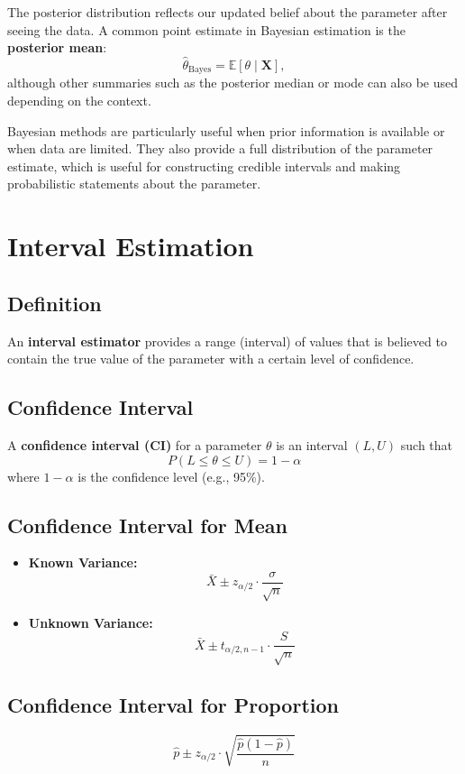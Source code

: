 \documentclass[twoside]{book}
\begin{document}
The posterior distribution reflects our updated belief about the parameter after seeing the data. A common point estimate in Bayesian estimation is the \textbf{posterior mean}:
\[
\hat{\theta}_{\text{Bayes}} = \mathbb{E}[\theta \mid \mathbf{X}],
\]
although other summaries such as the posterior median or mode can also be used depending on the context.

Bayesian methods are particularly useful when prior information is available or when data are limited. They also provide a full distribution of the parameter estimate, which is useful for constructing credible intervals and making probabilistic statements about the parameter.



\section{Interval Estimation}
\subsection{Definition}
An \textbf{interval estimator} provides a range (interval) of values that is believed to contain the true value of the parameter with a certain level of confidence.

\subsection{Confidence Interval}
A \textbf{confidence interval (CI)} for a parameter \( \theta \) is an interval \( (L, U) \) such that
\[
P(L \leq \theta \leq U) = 1 - \alpha
\]
where \( 1 - \alpha \) is the confidence level (e.g., 95\%).

\subsection{Confidence Interval for Mean}
\begin{itemize}
    \item \textbf{Known Variance:}
    \[
    \bar{X} \pm z_{\alpha/2} \cdot \frac{\sigma}{\sqrt{n}}
    \]

    \item \textbf{Unknown Variance:}
    \[
    \bar{X} \pm t_{\alpha/2, n-1} \cdot \frac{S}{\sqrt{n}}
    \]
\end{itemize}

\subsection{Confidence Interval for Proportion}
\[
\hat{p} \pm z_{\alpha/2} \cdot \sqrt{\frac{\hat{p}(1 - \hat{p})}{n}}
\]
\end{document}
